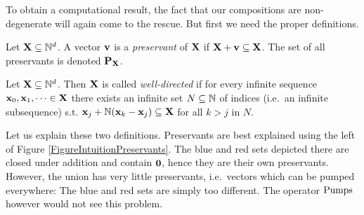 To obtain a computational result, the fact that our compositions are non-degenerate will again come to the rescue. But first we need the proper definitions.

\begin{definition}
Let \(\mathbf{X} \subseteq \mathbb{N}^d\). A vector \(\mathbf{v}\) is a \emph{preservant} of \(\mathbf{X}\) if \(\mathbf{X}+\mathbf{v} \subseteq \mathbf{X}\). The set of all preservants is denoted \(\operatorname{\mathbf{P}_{\mathbf{X}}}\).
\end{definition}

\begin{definition}
Let \(\mathbf{X} \subseteq \mathbb{N}^d\). Then \(\mathbf{X}\) is called \emph{well-directed} if for every infinite sequence \(\mathbf{x}_0, \mathbf{x}_1, \dots \in \mathbf{X}\) there exists an infinite set \(N \subseteq \mathbb{N} \) of indices (i.e.\ an infinite subsequence) s.t. \(\mathbf{x}_j+\mathbb{N}(\mathbf{x}_k-\mathbf{x}_j) \subseteq \mathbf{X}\) for all \(k>j\) in \(N\).
\end{definition}

Let us explain these two definitions. Preservants are best explained using the left of Figure \ref{FigureIntuitionPreservants}. The blue and red sets depicted there are closed under addition and contain \(\mathbf{0}\), hence they are their own preservants. However, the union has very little preservants, i.e.\ vectors which can be pumped everywhere: The blue and red sets are simply too different. The operator \(\operatorname{Pumps}\) however would not see this problem.

